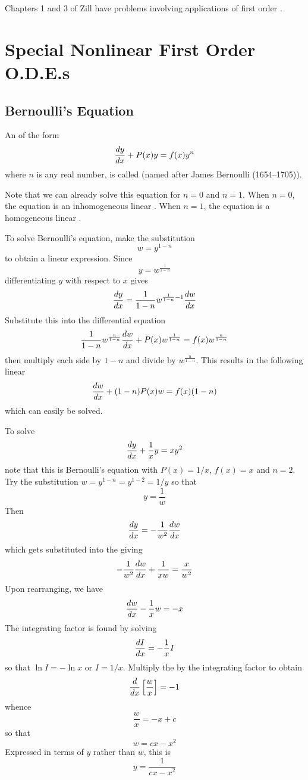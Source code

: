 
\begin{exercise}
Chapters 1 and 3 of Zill have problems involving applications of
first order \ODEs.
\end{exercise}

\section{Special Nonlinear First Order O.D.E.s}
\label{ode sec:special}

\subsection{Bernoulli's Equation}
\label{ode sec:bernoulli}

An \ODE of the form
$$\frac{dy}{dx}+P(x)y=f(x)y^n$$
where $n$ is any real number, is called  (named
after James Bernoulli (1654--1705)).

Note that we can already solve this equation for $n=0$ and $n=1$.  When
$n=0$, the equation is an inhomogeneous linear \ODE.  When $n=1$, the
equation is a homogeneous linear \ODE.

To solve Bernoulli's equation, make the substitution
$$w=y^{1-n}$$
to obtain a linear expression.  Since
$$y=w^{\frac{1}{1-n}}$$
differentiating $y$ with respect to $x$ gives 
$$\frac{dy}{dx}=\frac{1}{1-n}w^{\frac{1}{1-n}-1}\frac{dw}{dx}$$
Substitute this into the differential equation
$$\frac{1}{1-n}w^{\frac{n}{1-n}}\frac{dw}{dx}+P(x)w^{\frac{1}{1-n}}=
f(x)w^{\frac{n}{1-n}}$$
then multiply each side by $1-n$ and divide by $w^{\frac{n}{1-n}}$.  This
results in the following linear \ODE
$$\frac{dw}{dx}+(1-n)P(x)w=f(x)(1-n)$$
which can easily be solved.

\begin{example}
To solve
$$\frac{dy}{dx}+\frac{1}{x}y=xy^2$$
note that this is Bernoulli's equation with $P(x)=1/x$, $f(x)=x$ and $n=2$.
Try the substitution $w=y^{1-n}=y^{1-2}=1/y$ so that 
$$y=\frac{1}{w}$$
Then
$$\frac{dy}{dx}=-\frac{1}{w^2}\frac{dw}{dx}$$
which gets substituted into the \ODE giving
$$-\frac{1}{w^2}\frac{dw}{dx}+\frac{1}{xw}=\frac{x}{w^2}$$
Upon rearranging, we have
$$\frac{dw}{dx}-\frac{1}{x}w=-x$$
The integrating factor is found by solving
$$\frac{dI}{dx}=-\frac{1}{x}I$$
so that $\ln I=- \ln x$ or $I=1/x$.  Multiply the \ODE by the integrating
factor to obtain
$$\frac{d}{d{x}}\left[\frac{w}{x}\right]=-1$$
whence
$$\frac{w}{x}=-x+c$$
so that
$$w=cx-x^2$$
Expressed in terms of $y$ rather than $w$, this is
$$y=\frac{1}{cx-x^2}$$
\end{example}

